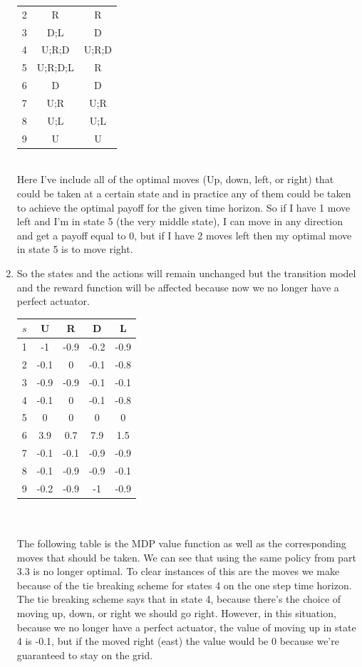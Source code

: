 \documentclass[submit]{harvardml}
\begin{document}
\begin{enumerate}
\begin{tabular}{c | c | c}
	2 & R & R \\
	3 & D;L & D \\
	4 & U;R;D & U;R;D \\
	5 & U;R;D;L & R \\
	6 & D & D \\
	7 & U;R & U;R \\
	8 & U;L & U;L \\
	9 & U & U \\
\end{tabular} \\
Here I've include all of the optimal moves (Up, down, left, or right) that could be taken at a certain state and in practice any of them could be taken to achieve the optimal payoff for the given time horizon.  So if I have 1 move left and I'm in state 5 (the very middle state), I can move in any direction and get a payoff equal to 0, but if I have 2 moves left then my optimal move in state 5 is to move right.  
\item So the states and the actions will remain unchanged but the transition model and the reward function will be affected because now we no longer have a perfect actuator.  \\
\begin{tabular}{c|c|c|c|c} 
	$s$ & U & R & D & L \\
	\hline 
	1 & -1 & -0.9 & -0.2 & -0.9 \\
	2 & -0.1 & 0 & -0.1 & -0.8 \\
	3 & -0.9 & -0.9 & -0.1 & -0.1 \\
	4 & -0.1 & 0 & -0.1 & -0.8 \\
	5 & 0 & 0 & 0 & 0 \\
	6 & 3.9 & 0.7 & 7.9 & 1.5 \\
	7 & -0.1 & -0.1 & -0.9 & -0.9 \\
	8 & -0.1 & -0.9 & -0.9 & -0.1 \\
	9 & -0.2 & -0.9 & -1 & -0.9 \\ 	
\end{tabular}
\\\\
The following table is the MDP value function as well as the corresponding moves that should be taken.  We can see that using the same policy from part 3.3 is no longer optimal.  To clear instances of this are the moves we make because of the tie breaking scheme for states 4 on the one step time horizon.  The tie breaking scheme says that in state 4, because there's the choice of moving up, down, or right we should go right. However, in this situation, because we no longer have a perfect actuator, the value of moving up in state 4 is -0.1, but if the moved right (east) the value would be 0 because we're guaranteed to stay on the grid.  


\end{enumerate}
\end{document}
